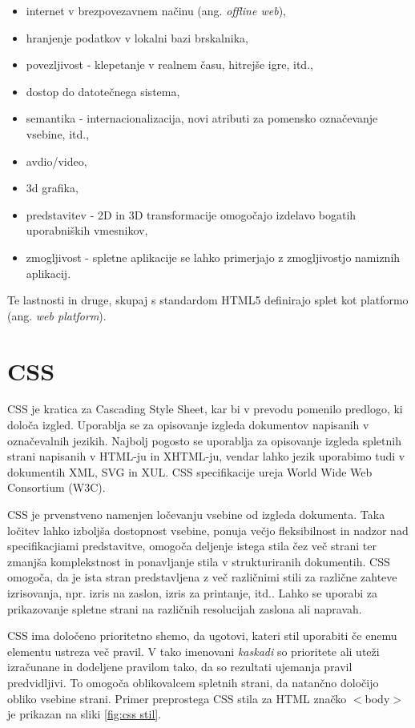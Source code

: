\documentclass[a4paper, 12pt]{book}
\begin{document}
\begin{itemize}
\item internet v brezpovezavnem na\v cinu (ang. \textit{offline web}),
\item hranjenje podatkov v lokalni bazi brskalnika,
\item povezljivost - klepetanje v realnem \v casu, hitrej\v se igre, itd.,
\item dostop do datote\v cnega sistema,
\item semantika - internacionalizacija, novi atributi za pomensko ozna\v cevanje vsebine, itd.,
\item avdio/video,
\item 3d grafika,
\item predstavitev - 2D in 3D transformacije omogo\v cajo izdelavo bogatih uporabni\v skih vmesnikov,
\item zmogljivost - spletne aplikacije se lahko primerjajo z zmogljivostjo namiznih aplikacij.
\end{itemize}

Te lastnosti in druge, skupaj s standardom HTML5 definirajo splet kot platformo (ang. \textit{web platform}).

\section{CSS}
CSS je kratica za Cascading Style Sheet, kar bi v prevodu pomenilo predlogo, ki dolo\v ca izgled. Uporablja se za opisovanje izgleda dokumentov napisanih v ozna\v cevalnih jezikih. Najbolj pogosto se uporablja za opisovanje izgleda spletnih strani napisanih v HTML-ju in XHTML-ju, vendar lahko jezik uporabimo tudi v dokumentih XML, SVG in XUL. CSS specifikacije ureja World Wide Web Consortium (W3C).

CSS je prvenstveno namenjen lo\v cevanju vsebine od izgleda dokumenta. Taka lo\v citev lahko izbolj\v sa dostopnost vsebine, ponuja ve\v cjo fleksibilnost in nadzor nad specifikacjiami predstavitve, omogo\v ca deljenje istega stila \v cez ve\v c strani ter zmanj\v sa komplekstnost in ponavljanje stila v strukturiranih dokumentih. CSS omogo\v ca, da je ista stran predstavljena z ve\v c razli\v cnimi stili za razli\v cne zahteve izrisovanja, npr. izris na zaslon, izris za printanje, itd.. Lahko se uporabi za prikazovanje spletne strani na razli\v cnih resolucijah zaslona ali napravah.

CSS ima dolo\v ceno prioritetno shemo, da ugotovi, kateri stil uporabiti \v ce enemu elementu ustreza ve\v c pravil. V tako imenovani \emph{kaskadi} so prioritete ali ute\v zi izra\v cunane in dodeljene pravilom tako, da so rezultati ujemanja pravil predvidljivi. To omogo\v ca oblikovalcem spletnih strani, da natan\v cno dolo\v cijo obliko vsebine strani. Primer preprostega CSS stila za HTML zna\v cko $<$body$>$ je prikazan na sliki \ref{fig:css stil}.
\end{document}
